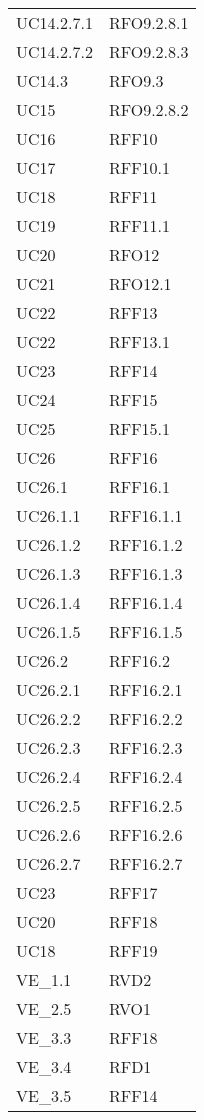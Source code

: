 \begin{longtable}{ >{\centering}p{}
			>{\centering}p{}}
UC14.2.7.1 & RFO9.2.8.1 \tabularnewline
UC14.2.7.2 & RFO9.2.8.3 \tabularnewline
UC14.3 & RFO9.3 \tabularnewline
UC15 & RFO9.2.8.2 \tabularnewline
UC16 & RFF10 \tabularnewline
UC17 & RFF10.1 \tabularnewline
UC18 & RFF11 \tabularnewline
UC19 & RFF11.1 \tabularnewline
UC20 & RFO12 \tabularnewline
UC21 & RFO12.1 \tabularnewline
UC22 & RFF13 \tabularnewline
UC22 & RFF13.1 \tabularnewline
UC23 & RFF14 \tabularnewline
UC24 & RFF15 \tabularnewline
UC25 & RFF15.1 \tabularnewline
UC26 & RFF16 \tabularnewline
UC26.1 & RFF16.1 \tabularnewline
UC26.1.1 & RFF16.1.1 \tabularnewline
UC26.1.2 & RFF16.1.2 \tabularnewline
UC26.1.3 & RFF16.1.3 \tabularnewline
UC26.1.4 & RFF16.1.4 \tabularnewline
UC26.1.5 & RFF16.1.5 \tabularnewline
UC26.2 & RFF16.2 \tabularnewline
UC26.2.1 & RFF16.2.1 \tabularnewline
UC26.2.2 & RFF16.2.2 \tabularnewline
UC26.2.3 & RFF16.2.3 \tabularnewline
UC26.2.4 & RFF16.2.4 \tabularnewline
UC26.2.5 & RFF16.2.5 \tabularnewline
UC26.2.6 & RFF16.2.6 \tabularnewline
UC26.2.7 & RFF16.2.7 \tabularnewline
UC23 & RFF17 \tabularnewline
UC20 & RFF18 \tabularnewline
UC18 & RFF19 \tabularnewline
VE\_1.1 & RVD2 \tabularnewline
VE\_2.5 & RVO1 \tabularnewline
VE\_3.3 & RFF18 \tabularnewline
VE\_3.4 & RFD1 \tabularnewline
VE\_3.5 & RFF14 \tabularnewline
	\end{longtable}

